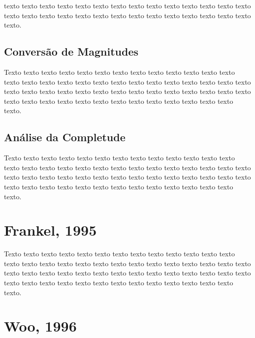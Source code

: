 texto texto texto texto texto texto texto texto texto texto texto texto texto
texto texto texto texto texto texto texto texto texto texto texto texto texto
texto texto texto.

\subsection{Conversão de Magnitudes}
\label{sec:fundamentos}

Texto texto texto texto texto texto texto texto texto texto texto texto texto
texto texto texto texto texto texto texto texto texto texto texto texto texto
texto texto texto texto texto texto texto texto texto texto texto texto texto
texto texto texto texto texto texto texto texto texto texto texto texto texto
texto texto texto.

\subsection{Análise da Completude}
\label{sec:fundamentos}

Texto texto texto texto texto texto texto texto texto texto texto texto texto
texto texto texto texto texto texto texto texto texto texto texto texto texto
texto texto texto texto texto texto texto texto texto texto texto texto texto
texto texto texto texto texto texto texto texto texto texto texto texto texto
texto texto texto.


\section{Frankel, 1995}
\label{sec:fundamentos}

Texto texto texto texto texto texto texto texto texto texto texto texto texto
texto texto texto texto texto texto texto texto texto texto texto texto texto
texto texto texto texto texto texto texto texto texto texto texto texto texto
texto texto texto texto texto texto texto texto texto texto texto texto texto
texto texto texto.

\section{Woo, 1996}
\label{sec:fundamentos}

